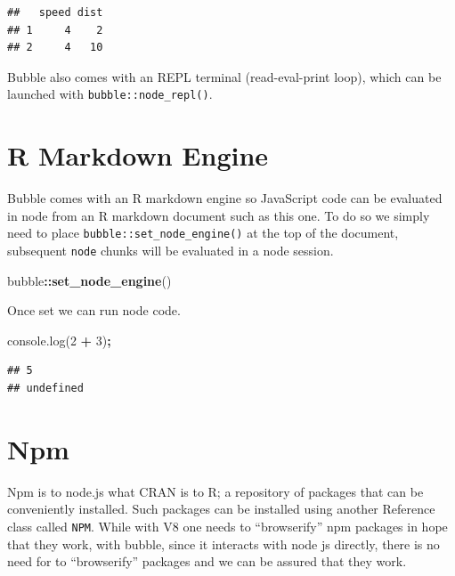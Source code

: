 \documentclass[
]{krantz}
\makeatletter
\newenvironment{Shaded}{\begin{snugshade}}{\end{snugshade}}
\newcommand{\AttributeTok}[1]{\textcolor[rgb]{0.61,0.61,0.61}{#1}}
\newcommand{\DecValTok}[1]{\textcolor[rgb]{0.06,0.06,0.06}{#1}}
\newcommand{\KeywordTok}[1]{\textcolor[rgb]{0.27,0.27,0.27}{\textbf{#1}}}
\newcommand{\NormalTok}[1]{#1}
\newcommand{\OperatorTok}[1]{\textcolor[rgb]{0.43,0.43,0.43}{\textbf{#1}}}
\newcommand{\VariableTok}[1]{\textcolor[rgb]{0,0,0}{#1}}
\newenvironment{kframe}{%
\medskip{}
\setlength{\fboxsep}{.8em}
 \def\at@end@of@kframe{}%
 \ifinner\ifhmode%
  \def\at@end@of@kframe{\end{minipage}}%
  \begin{minipage}{\columnwidth}%
 \fi\fi%
 \def\FrameCommand##1{\hskip\@totalleftmargin \hskip-\fboxsep
 \colorbox{shadecolor}{##1}\hskip-\fboxsep
     \hskip-\linewidth \hskip-\@totalleftmargin \hskip\columnwidth}%
 \MakeFramed {\advance\hsize-\width
   \@totalleftmargin\z@ \linewidth\hsize
   \@setminipage}}%
 {\par\unskip\endMakeFramed%
 \at@end@of@kframe}
\renewenvironment{Shaded}{\begin{kframe}}{\end{kframe}}
\makeatother
\begin{document}
\begin{verbatim}
##   speed dist
## 1     4    2
## 2     4   10
\end{verbatim}

Bubble also comes with an REPL terminal (read-eval-print loop), which can be launched with \texttt{bubble::node\_repl()}.

\hypertarget{r-markdown-engine}{%
\section*{R Markdown Engine}\label{r-markdown-engine}}


Bubble comes with an R markdown engine so JavaScript code can be evaluated in node from an R markdown document such as this one. To do so we simply need to place \texttt{bubble::set\_node\_engine()} at the top of the document, subsequent \texttt{node} chunks will be evaluated in a node session.

\begin{Shaded}
\begin{Highlighting}[]
\NormalTok{bubble}\OperatorTok{::}\KeywordTok{set\_node\_engine}\NormalTok{()}
\end{Highlighting}
\end{Shaded}

Once set we can run node code.

\begin{Shaded}
\begin{Highlighting}[]
\VariableTok{console}\NormalTok{.}\AttributeTok{log}\NormalTok{(}\DecValTok{2} \OperatorTok{+} \DecValTok{3}\NormalTok{)}\OperatorTok{;}
\end{Highlighting}
\end{Shaded}

\begin{verbatim}
## 5
## undefined
\end{verbatim}

\hypertarget{npm}{%
\section*{Npm}\label{npm}}


Npm is to node.js what CRAN is to R; a repository of packages that can be conveniently installed. Such packages can be installed using another Reference class called \texttt{NPM}. While with V8 one needs to ``browserify'' npm packages in hope that they work, with bubble, since it interacts with node js directly, there is no need for to ``browserify'' packages and we can be assured that they work.
\end{document}
